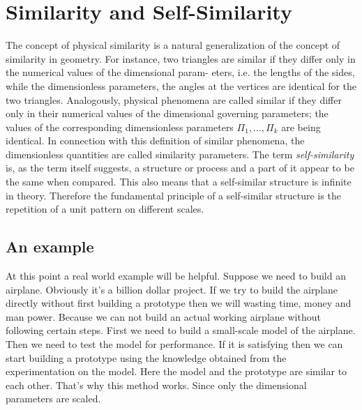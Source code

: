 \section{Similarity and Self-Similarity}

	The concept of physical similarity is a natural generalization of the	concept of similarity in geometry. For instance, two triangles are similar	if they differ only in the numerical values of the dimensional param-	eters, i.e. the lengths of the sides, while the dimensionless parameters,	the angles at the vertices are identical for the two triangles. Analogously,	physical phenomena are called similar if they differ only in their numerical values of the dimensional governing parameters; the values of the	corresponding dimensionless parameters $\Pi_1, \ldots, \Pi_k$ are being identical.	In connection with this definition of similar phenomena, the dimensionless quantities are called similarity parameters.
	The term \textit{self-similarity} is, as the term itself suggests, a structure or process and a part of it appear to be the same when compared. This also means that a self-similar structure is infinite in theory. Therefore the fundamental principle of a self-similar structure is the repetition of a unit pattern on different scales. 
	\subsection{An example}
	At this point a real world example will be helpful. Suppose we need to build an airplane. Obviously it's a billion dollar project. If we try to build the airplane directly without first building a prototype then we will wasting time, money and man power. Because we can not build an actual working airplane without following certain steps. First we need to build a small-scale model of the airplane. Then we need to test the model for performance. If it is satisfying then we can start building a prototype using the knowledge obtained from the experimentation on the model. Here the model and the prototype are similar to each other. That's why this method works. Since only the dimensional parameters are scaled.
